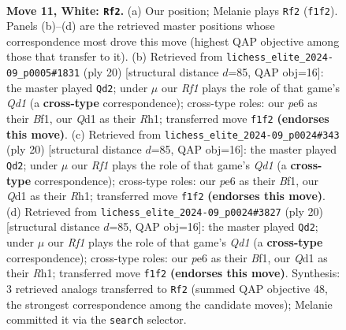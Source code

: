 \documentclass[11pt]{article}
\begin{document}
\clearpage

\begin{figure}[p]\centering
\begin{subfigure}{0.46\textwidth}\centering
\resizebox{\linewidth}{!}{%
\newchessgame
\chessboard[
  setfen={r1bq1rk1/p2n1ppp/4pn2/2pp4/8/2PBPNP1/PP4PP/RN1Q1RK1 w - - 0 11},
  showmover=false,
  pgfstyle=straightmove, color=movearrow, markmove={f1-f2}
]}
\caption{}
\end{subfigure}\hfill
\begin{subfigure}{0.46\textwidth}\centering
\resizebox{\linewidth}{!}{%
\newchessgame
\chessboard[
  setfen={r2qkb1r/1p1n1pp1/p2p1n2/3Pp2p/8/1N2BP2/PPP3PP/R2QKB1R w KQkq - 1 11},
  showmover=false,
  pgfstyle=straightmove, color=movearrow, markmove={d1-d2}
]}
\caption{}
\end{subfigure}
\\[4pt]
\begin{subfigure}{0.46\textwidth}\centering
\resizebox{\linewidth}{!}{%
\newchessgame
\chessboard[
  setfen={r2qkb1r/1p1n1pp1/p2p1n2/3Pp2p/8/1N2BP2/PPP3PP/R2QKB1R w KQkq - 1 11},
  showmover=false,
  pgfstyle=straightmove, color=movearrow, markmove={d1-d2}
]}
\caption{}
\end{subfigure}\hfill
\begin{subfigure}{0.46\textwidth}\centering
\resizebox{\linewidth}{!}{%
\newchessgame
\chessboard[
  setfen={r2qkb1r/1p1n1pp1/p2p1n2/3Pp2p/8/1N2BP2/PPP3PP/R2QKB1R w KQkq - 1 11},
  showmover=false,
  pgfstyle=straightmove, color=movearrow, markmove={d1-d2}
]}
\caption{}
\end{subfigure}
\caption{\textbf{Move 11, White: \texttt{Rf2}.} (a) Our position; Melanie plays \texttt{Rf2} (\texttt{f1f2}). Panels (b)--(d) are the retrieved master positions whose correspondence most drove this move (highest QAP objective among those that transfer to it). (b) Retrieved from \texttt{lichess\_elite\_2024-09\_p0005\#1831} (ply 20) [structural distance $d$=85, QAP obj=16]: the master played \texttt{Qd2}; under $\mu$ our \emph{Rf1} plays the role of that game's \emph{Qd1} (a \textbf{cross-type} correspondence); cross-type roles: our \emph{p}e6 as their \emph{B}f1, our \emph{Q}d1 as their \emph{R}h1; transferred move \texttt{f1f2} \textbf{(endorses this move)}. (c) Retrieved from \texttt{lichess\_elite\_2024-09\_p0024\#343} (ply 20) [structural distance $d$=85, QAP obj=16]: the master played \texttt{Qd2}; under $\mu$ our \emph{Rf1} plays the role of that game's \emph{Qd1} (a \textbf{cross-type} correspondence); cross-type roles: our \emph{p}e6 as their \emph{B}f1, our \emph{Q}d1 as their \emph{R}h1; transferred move \texttt{f1f2} \textbf{(endorses this move)}. (d) Retrieved from \texttt{lichess\_elite\_2024-09\_p0024\#3827} (ply 20) [structural distance $d$=85, QAP obj=16]: the master played \texttt{Qd2}; under $\mu$ our \emph{Rf1} plays the role of that game's \emph{Qd1} (a \textbf{cross-type} correspondence); cross-type roles: our \emph{p}e6 as their \emph{B}f1, our \emph{Q}d1 as their \emph{R}h1; transferred move \texttt{f1f2} \textbf{(endorses this move)}. Synthesis: 3 retrieved analogs transferred to \texttt{Rf2} (summed QAP objective 48, the strongest correspondence among the candidate moves); Melanie committed it via the \texttt{search} selector.}

\end{figure}
\end{document}
